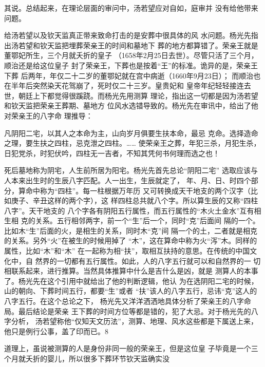 其说。总结起来，在理论层面的审问中，汤若望应对自如，庭审并%
没有给他带来问题。%
\par
给汤若望以及钦天监真正带来致命打击的是安葬中很具体的风%
水问题。杨光先指出汤若望和钦天监把埋葬荣亲王的时间和墓地下%
葬的地方都算错了。荣亲王就是董鄂妃所生，三个月就夭折的皇子%
（1658年2月25日去世）。尽管只活了三个月，顺治还是给这位皇子%
封了荣亲王，下葬也是按着“王”的标准。诡异的是，荣亲王下葬%
后两年，年仅二十二岁的董鄂妃就在宫中病逝（1660年9月23日）；%
而顺治也在半年后突然染天花驾崩了，死时仅二十三岁。皇贵妃和%
皇帝年纪轻轻接连去世，朝廷上下都觉得很蹊跷。而杨光先用测算%
理论，指出这一切都是因为汤若望和钦天监把荣亲王葬期、墓地方%
位风水选错导致的。杨光先在审讯中，给出了他对荣亲王的八字命%
理推导：%
\par
{\bookkai 凡阴阳二宅，以其人之本命为主，山向岁月俱要生扶本命，最忌}%
{\bookkai 克命。选择造命之理，要生扶之四柱，忌克泄之四柱。……}%
{\bookkai {}使荣亲王之葬，年犯三杀，月犯生杀，}%
{\bookkai 日犯党杀，时犯伏吟，四柱无一吉者，不知其凭何书何理而选之也！}%
\par
死后墓地称为阴宅，人生前所居为阳宅。杨光先首先总论“阴阳二宅”%
选取应该与人本来出生时的生辰八字匹配。人一出生，生辰就定了，%
年、月、日、时四个部分，算命中称为“四柱”。每一柱根据万年历%
又可转换成天干地支的两个汉字（比如庚子、辛丑这样的两个字），这%
样四柱总共就八个字。所以算生辰的又称“四柱八字”。天干地支的%
八个字各有阴阳五行属性，而五行属性的“木火土金水”互有相生相%
克的关系。五行相邻两字，前一个“生”后一个，同时“克”后面间%
隔的一个。比如木“生”后面的火，是相生的关系，同时木“克”间%
隔一个的土，二者就是相克的关系。另外“火”在被生的时候用掉了%
“木”，这在算命中称为火“泻”木。同样的属性，比如“木”和“木”%
在一起称为相“扶”，取相互扶持的意思。在传统的中国文化中，自%
然界的一切都有五行属性。如此，人的八字五行就可以和自然界的一%
切相联系起来，进行推算。当然具体推算中什么是吉什么是凶，就是%
测算人的本事了。杨光先在这个引用中就给出了他的判断逻辑，他认%
为在选阴阳二宅的时候，山的朝向、下葬时间五行，都要“生”或者%
“扶”该人的八字五行，忌讳“克”这人的八字五行。在这个总论之下，%
杨光先又洋洋洒洒地具体分析了荣亲王的八字命局。最后结论是荣亲%
王下葬的时间方位等都是错的，犯了大忌。对于杨光先的八字分析，%
汤若望称他“仅知天文历法”，测算、地理、风水这些都是下属送上来，%
他只是例行公事，盖了印而已。8%
\par
道理上，虽说被测算的人是身份非同一般的荣亲王，但是这位皇%
子毕竟是一个三个月就夭折的婴儿，所以很多下葬环节钦天监确实没%
